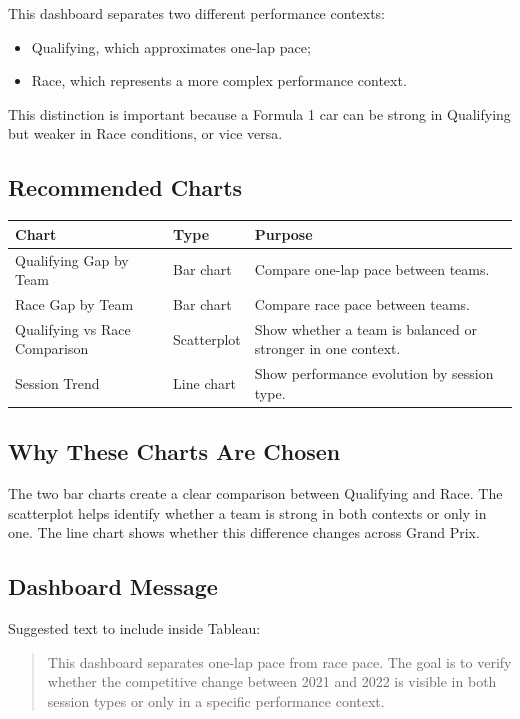 \documentclass[12pt,a4paper]{article}
\begin{document}
	This dashboard separates two different performance contexts:
	
	\begin{itemize}[leftmargin=1.2cm]
		\item Qualifying, which approximates one-lap pace;
		\item Race, which represents a more complex performance context.
	\end{itemize}
	
	This distinction is important because a Formula 1 car can be strong in Qualifying but weaker in Race conditions, or vice versa.
	
	\subsection{Recommended Charts}
	
	\begin{longtable}{p{4cm} p{4cm} p{6cm}}
		\toprule
		\textbf{Chart} & \textbf{Type} & \textbf{Purpose} \\
		\midrule
		Qualifying Gap by Team & Bar chart & Compare one-lap pace between teams. \\
		Race Gap by Team & Bar chart & Compare race pace between teams. \\
		Qualifying vs Race Comparison & Scatterplot & Show whether a team is balanced or stronger in one context. \\
		Session Trend & Line chart & Show performance evolution by session type. \\
		\bottomrule
	\end{longtable}
	
	\subsection{Why These Charts Are Chosen}
	
	The two bar charts create a clear comparison between Qualifying and Race.
	The scatterplot helps identify whether a team is strong in both contexts or only in one.
	The line chart shows whether this difference changes across Grand Prix.
	
	\subsection{Dashboard Message}
	
	Suggested text to include inside Tableau:
	
	\begin{quote}
		This dashboard separates one-lap pace from race pace. The goal is to verify whether the competitive change between 2021 and 2022 is visible in both session types or only in a specific performance context.
	\end{quote}
	
\end{document}
